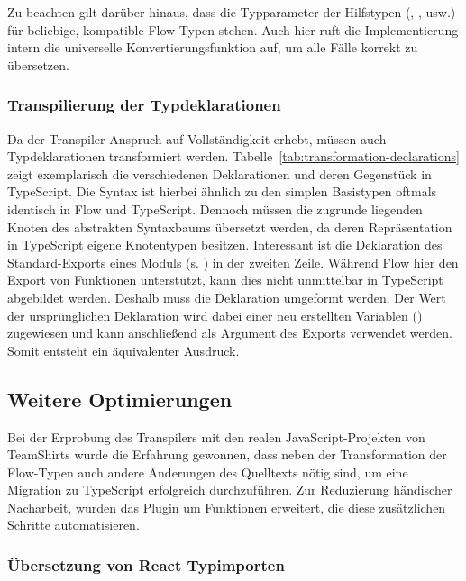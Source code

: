 {\medbreak


Zu beachten gilt darüber hinaus, dass die Typparameter der Hilfstypen (, ,  usw.) für beliebige, kompatible Flow-Typen stehen. Auch hier ruft die Implementierung intern die universelle Konvertierungsfunktion  auf, um alle Fälle korrekt zu übersetzen.

\subsubsection{Transpilierung der Typdeklarationen}

Da der Transpiler Anspruch auf Vollständigkeit erhebt, müssen auch Typdeklarationen transformiert werden. Tabelle~\ref{tab:transformation-declarations} zeigt exemplarisch die verschiedenen Deklarationen und deren Gegenstück in TypeScript. Die Syntax ist hierbei ähnlich zu den simplen Basistypen oftmals identisch in Flow und TypeScript. Dennoch müssen die zugrunde liegenden Knoten des abstrakten Syntaxbaums übersetzt werden, da deren Repräsentation in TypeScript eigene Knotentypen besitzen. Interessant ist die Deklaration des Standard-Exports eines Moduls (s. \autocite[377]{ECMASCRIPT:2019}) in der zweiten Zeile. Während Flow hier den Export von Funktionen unterstützt, kann dies nicht unmittelbar in TypeScript abgebildet werden. Deshalb muss die Deklaration umgeformt werden. Der Wert der ursprünglichen Deklaration wird dabei einer neu erstellten Variablen () zugewiesen und kann anschließend als Argument des Exports verwendet werden. Somit entsteht ein äquivalenter Ausdruck.

\medbreak


\subsection{Weitere Optimierungen}
\label{sec:optimizations}

Bei der Erprobung des Transpilers mit den realen JavaScript-Projekten von TeamShirts wurde die Erfahrung gewonnen, dass neben der Transformation der Flow-Typen auch andere Änderungen des Quelltexts nötig sind, um eine Migration zu TypeScript erfolgreich durchzuführen. Zur Reduzierung händischer Nacharbeit, wurden das Plugin um Funktionen erweitert, die diese zusätzlichen Schritte automatisieren.

\subsubsection{Übersetzung von React Typimporten}
\label{sec:react-type-import-mapping}

}

